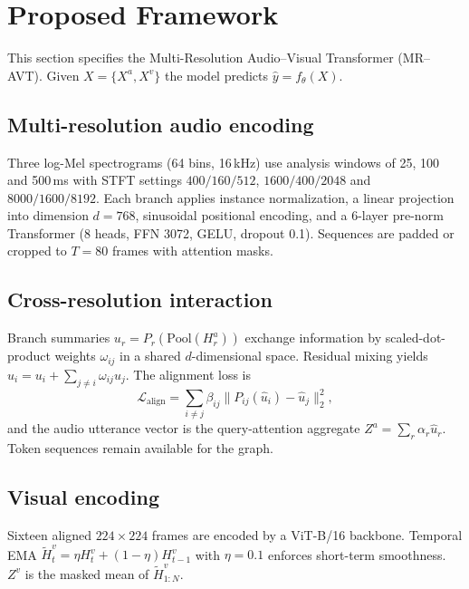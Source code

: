 \section{Proposed Framework}
\label{sec:method}

This section specifies the Multi-Resolution Audio--Visual Transformer (MR--AVT).
Given \(X=\{X^{a},X^{v}\}\) the model predicts \(\hat y=f_{\theta}(X)\).

\subsection{Multi-resolution audio encoding}
Three log-Mel spectrograms (64 bins, 16\,kHz) use analysis windows of 25, 100 and 500\,ms with STFT settings \(400/160/512\), \(1600/400/2048\) and \(8000/1600/8192\). Each branch applies instance normalization, a linear projection into dimension \(d=768\), sinusoidal positional encoding, and a 6-layer pre-norm Transformer (8 heads, FFN 3072, GELU, dropout 0.1). Sequences are padded or cropped to \(T=80\) frames with attention masks.

\subsection{Cross-resolution interaction}
Branch summaries \(u_r=P_r(\mathrm{Pool}(H_r^{a}))\) exchange information by scaled-dot-product weights \(\omega_{ij}\) in a shared \(d\)-dimensional space. Residual mixing yields \(\hat u_i=u_i+\sum_{j\neq i}\omega_{ij}u_j\). The alignment loss is
\begin{equation}
\mathcal L_{\mathrm{align}}=\sum_{i\neq j}\beta_{ij}\big\|P_{ij}(\hat u_i)-\hat u_j\big\|_2^2,
\end{equation}
and the audio utterance vector is the query-attention aggregate \(Z^{a}=\sum_r\alpha_r\hat u_r\). Token sequences remain available for the graph.

\subsection{Visual encoding}
Sixteen aligned \(224\times224\) frames are encoded by a ViT-B/16 backbone. Temporal EMA \(\tilde H_t^{v}=\eta H_t^{v}+(1-\eta)H_{t-1}^{v}\) with \(\eta=0.1\) enforces short-term smoothness. \(Z^{v}\) is the masked mean of \(\tilde H_{1:N}^{v}\).

